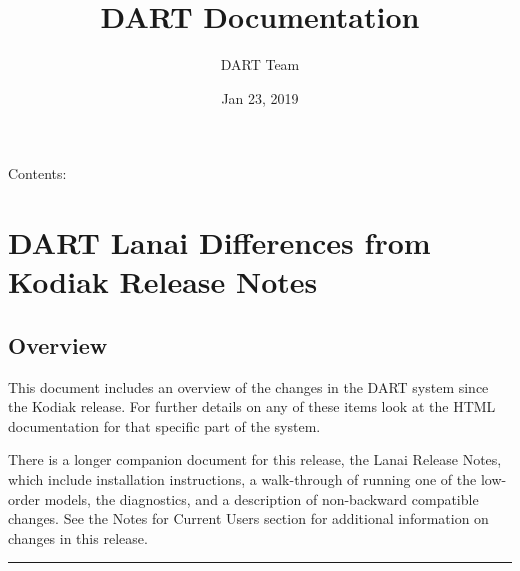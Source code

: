 \documentclass[letterpaper,10pt,english]{sphinxmanual}
\title{DART Documentation}
\date{Jan 23, 2019}
\author{DART Team}
\begin{document}
\maketitle
\tableofcontents
{}\label{index::doc}


Contents:


\chapter{DART Lanai Differences from Kodiak Release Notes}
\label{docs/Lanai_diffs_from_Kodiak::doc}\label{docs/Lanai_diffs_from_Kodiak:dart-lanai-differences-from-kodiak-release-notes}\label{docs/Lanai_diffs_from_Kodiak:welcome-to-dart-s-documentation}

\section{Overview}
\label{docs/Lanai_diffs_from_Kodiak:overview}
This document includes an overview of the changes in the DART system
since the Kodiak release. For further details on any of these items look
at the HTML documentation for that specific part of the system.

There is a longer companion document for this release, the Lanai
Release Notes, which include installation instructions, a walk-through of running one
of the low-order models, the diagnostics, and a description of
non-backward compatible changes. See the Notes for Current
Users section for additional information on changes in this release.


\bigskip\hrule{}\bigskip
\end{document}

